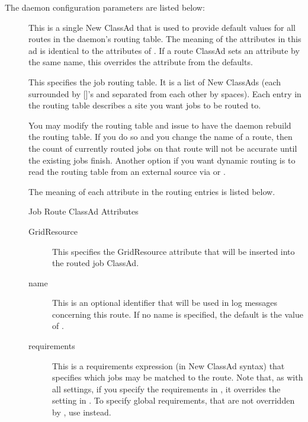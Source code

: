 The  daemon configuration parameters are listed below:

\begin{description}

\item[] \label{param:JobRouterDefaults}
This is a single New ClassAd that is used to provide default values
for all routes in the  daemon's routing table.  The meaning of the
attributes in this ad is identical to the attributes of
.  If a route ClassAd sets an
attribute by the same name, this overrides the attribute from the
defaults.

\item[] \label{param:JobRouterEntries}
This specifies the job routing table.  It is a list of New ClassAds
(each surrounded by []'s and separated from each other by spaces).
Each entry in the routing table describes a site you want jobs to be
routed to.

You may modify the routing table and issue  to have
the  daemon rebuild the routing table.  If you do so and you change the
name of a route, then the count of currently routed jobs on that route
will not be accurate until the existing jobs finish.  Another option
if you want dynamic routing is to read the routing table from an
external source via  or
.

The meaning of each attribute in the routing entries is listed below.


{\Large Job Route ClassAd Attributes}

\begin{description}

\item[GridResource] This specifies the GridResource attribute that
will be inserted into the routed job ClassAd.

\item[name] This is an optional identifier that will be used in log
messages concerning this route.  If no name is specified, the default
is the value of .

\item[requirements] This is a requirements expression (in New ClassAd
syntax) that specifies which jobs may be matched to the route.  Note
that, as with all settings, if you specify the requirements in
, it overrides the setting in
.  To specify global requirements, that
are not overridden by , use
 instead.


\end{description}
\end{description}
